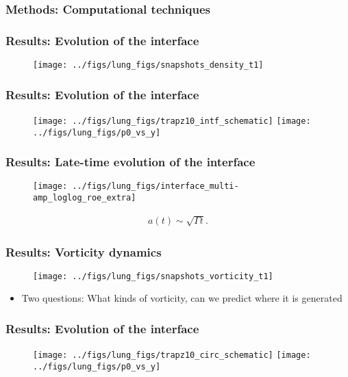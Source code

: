 \begin{frame} \frametitle{Methods: Computational techniques}
  \begin{figure}
    \centering
    
  \end{figure}
\end{frame}
\begin{frame} \frametitle{Results: Evolution of the interface}
  \begin{figure}
    \centering
    \texttt{[image: ../figs/lung\_figs/snapshots\_density\_t1]}
  \end{figure}
\end{frame}
\begin{frame} \frametitle{Results: Evolution of the interface}
  \begin{figure}
    \centering
    \texttt{[image: ../figs/lung\_figs/trapz10\_intf\_schematic]}
    \texttt{[image: ../figs/lung\_figs/p0\_vs\_y]}%
  \end{figure}
\end{frame}
\begin{frame} \frametitle{Results: Late-time evolution of the interface}
  \begin{minipage}{0.5\textwidth}
    \begin{figure}
      \centering
      \texttt{[image: ../figs/lung\_figs/interface\_multi-amp\_loglog\_roe\_extra]}
    \end{figure}
  \end{minipage}
  \hfill
  \begin{minipage}{0.48\textwidth}
    \begin{align*}
      a(t) \sim \sqrt{\Gamma t}.
    \end{align*}
  \end{minipage}
\end{frame}
\begin{frame} \frametitle{Results: Vorticity dynamics}
  \begin{figure}
    \centering
    \texttt{[image: ../figs/lung\_figs/snapshots\_vorticity\_t1]}
  \end{figure}
%
  \begin{itemize}
  \item Two questions: What kinds of vorticity, can we predict where it is generated
  \end{itemize}
\end{frame}
\begin{frame} \frametitle{Results: Evolution of the interface}
  \begin{figure}
    \centering
    \texttt{[image: ../figs/lung\_figs/trapz10\_circ\_schematic]}
    \texttt{[image: ../figs/lung\_figs/p0\_vs\_y]}%
  \end{figure}
\end{frame}
